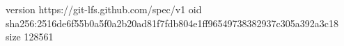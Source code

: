 version https://git-lfs.github.com/spec/v1
oid sha256:2516de6f55b0a5f0a2b20ad81f7fdb804e1ff96549738382937c305a392a3c18
size 128561
